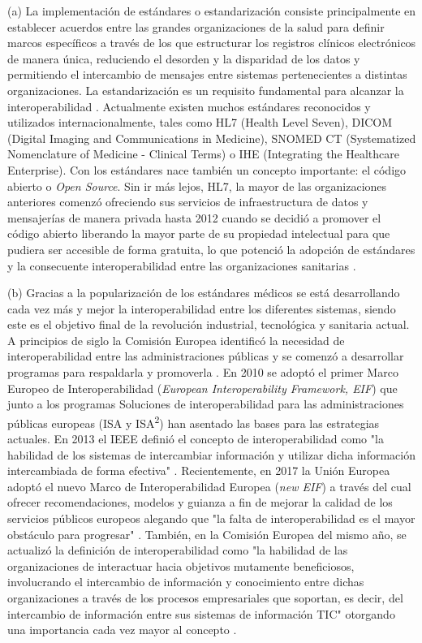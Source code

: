 (a) La implementación de estándares o estandarización consiste principalmente en establecer acuerdos entre las grandes organizaciones de la salud para definir marcos específicos a través de los que estructurar los registros clínicos electrónicos de manera única, reduciendo el desorden y la disparidad de los datos y permitiendo el intercambio de mensajes entre sistemas pertenecientes a distintas organizaciones. La estandarización es un requisito fundamental para alcanzar la interoperabilidad \cite{katehakis2019framework}. Actualmente existen muchos estándares reconocidos y utilizados internacionalmente, tales como HL7 (Health Level Seven), DICOM (Digital Imaging and Communications in Medicine), SNOMED CT (Systematized Nomenclature of Medicine - Clinical Terms) o IHE (Integrating the Healthcare Enterprise). Con los estándares nace también un concepto importante: el código abierto o \textit{Open Source}. Sin ir más lejos, HL7, la mayor de las organizaciones anteriores comenzó ofreciendo sus servicios de infraestructura de datos y mensajerías de manera privada hasta 2012 cuando se decidió a promover el código abierto liberando la mayor parte de su propiedad intelectual para que pudiera ser accesible de forma gratuita, lo que potenció la adopción de estándares y la consecuente interoperabilidad entre las organizaciones sanitarias \cite{berryman2013data}.

(b) Gracias a la popularización de los estándares médicos se está desarrollando cada vez más y mejor la interoperabilidad entre los diferentes sistemas, siendo este es el objetivo final de la revolución industrial, tecnológica y sanitaria actual. A principios de siglo la Comisión Europea identificó la necesidad de interoperabilidad entre las administraciones públicas y se comenzó a desarrollar programas para respaldarla y promoverla \cite{CEU1999ida}. En 2010 se adoptó el primer Marco Europeo de Interoperabilidad (\textit{European Interoperability Framework, EIF}) que junto a los programas Soluciones de interoperabilidad para las administraciones públicas europeas (ISA y ISA\textsuperscript{2}) han asentado las bases para las estrategias actuales. En 2013 el IEEE definió el concepto de interoperabilidad como "la habilidad de los sistemas de intercambiar información y utilizar dicha información intercambiada de forma efectiva" \cite{berryman2013data}. Recientemente, en 2017 la Unión Europea adoptó el nuevo Marco de Interoperabilidad Europea (\textit{new EIF})  a través del cual ofrecer recomendaciones, modelos y guianza a fin de mejorar la calidad de los servicios públicos europeos alegando que "la falta de interoperabilidad es el mayor obstáculo para progresar" \cite{kouroubali2019new}. También, en la Comisión Europea del mismo año, se actualizó la definición de interoperabilidad como "la habilidad de las organizaciones de interactuar hacia objetivos mutamente beneficiosos, involucrando el intercambio de información y conocimiento entre dichas organizaciones a través de los procesos empresariales que soportan, es decir, del intercambio de información entre sus sistemas de información TIC" otorgando una importancia cada vez mayor al concepto \cite{katehakis2019framework}\cite{CEU2017eif} \cite{casiano2022towards}.


